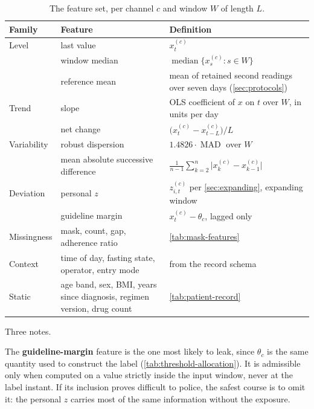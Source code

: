 \documentclass[12pt,a4paper,oneside]{report}
\begin{document}
\begin{table}[htbp]
\centering\footnotesize
\caption{The feature set, per channel $c$ and window $W$ of length $L$.}\label{tab:feature-set}
\begin{tabularx}{\textwidth}{@{}>{\raggedright\arraybackslash}p{1.9cm} >{\raggedright\arraybackslash}p{4.0cm} X@{}}
\toprule
\textbf{Family} & \textbf{Feature} & \textbf{Definition} \\
\midrule
Level & last value & $x^{(c)}_{t}$ \\
 & window median & $\operatorname{median}\{x^{(c)}_s : s \in W\}$ \\
 & reference mean & mean of retained second readings over seven days (\cref{sec:protocols}) \\
\addlinespace
Trend & slope & OLS coefficient of $x$ on $t$ over $W$, in units per day \\
 & net change & $\bigl(x^{(c)}_{t} - x^{(c)}_{t-L}\bigr)/L$ \\
\addlinespace
Variability & robust dispersion & $1.4826\cdot\operatorname{MAD}$ over $W$ \\
 & mean absolute successive difference & $\frac{1}{n-1}\sum_{k=2}^{n}\bigl\lvert x^{(c)}_k - x^{(c)}_{k-1}\bigr\rvert$ \\
\addlinespace
Deviation & personal $z$ & $z^{(c)}_{i,t}$ per \cref{sec:expanding}, expanding window \\
 & guideline margin & $x^{(c)}_{t} - \theta_c$, lagged only \\
\addlinespace
Missingness & mask, count, gap, adherence ratio & \cref{tab:mask-features} \\
\addlinespace
Context & time of day, fasting state, operator, entry mode & from the record schema \\
\addlinespace
Static & age band, sex, BMI, years since diagnosis, regimen version, drug count & \cref{tab:patient-record} \\
\bottomrule
\end{tabularx}
\end{table}

Three notes.

The \textbf{guideline-margin} feature is the one most likely to leak, since $\theta_c$ is the same quantity used to construct the label (\cref{tab:threshold-allocation}). It is admissible only when computed on a value strictly inside the input window, never at the label instant. If its inclusion proves difficult to police, the safest course is to omit it: the personal $z$ carries most of the same information without the exposure.
\end{document}
